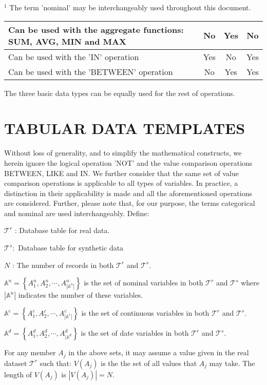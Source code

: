 \documentclass[10pt]{article}
\begin{document}
${ }^{1}$ The term 'nominal' may be interchangeably used throughout this document.

\begin{tabular}{|l|c|c|c|}
\hline
Can be used with the aggregate functions: SUM, AVG, MIN and MAX & No & Yes & No \\
\hline
Can be used with the 'IN' operation & Yes & No & Yes \\
\hline
Can be used with the 'BETWEEN' operation & No & Yes & Yes \\
\hline
\end{tabular}

The three basic data types can be equally used for the rest of operations.

\section{TABULAR DATA TEMPLATES}
Without loss of generality, and to simplify the mathematical constructs, we herein ignore the logical operation 'NOT' and the value comparison operations BETWEEN, LIKE and IN. We further consider that the same set of value comparison operations is applicable to all types of variables. In practice, a distinction in their applicability is made and all the aforementioned operations are considered. Further, please note that, for our purpose, the terms categorical and nominal are used interchangeably. Define:

$\mathcal{T}^{r}$ : Database table for real data.

$\mathcal{T}^{s}:$ Database table for synthetic data

$N$ : The number of records in both $\mathcal{T}^{r}$ and $\mathcal{T}^{s}$.

$\mathbb{A}^{n}=\left\{A_{1}^{n}, A_{2}^{n}, \cdots, A_{\left|\mathbb{A}^{n}\right|}^{n}\right\}$ is the set of nominal variables in both $\mathcal{T}^{r}$ and $\mathcal{T}^{s}$ where $\left|\mathbb{A}^{n}\right|$ indicates the number of these variables.

$\mathbb{A}^{c}=\left\{A_{1}^{c}, A_{2}^{c}, \cdots, A_{\left|\mathbb{A}^{c}\right|}^{c}\right\}$ is the set of continuous variables in both $\mathcal{T}^{r}$ and $\mathcal{T}^{s}$.

$\mathbb{A}^{d}=\left\{A_{1}^{d}, A_{2}^{d}, \cdots, A_{\mid \mathbb{A}^{d}}^{d}\right\}$ is the set of date variables in both $\mathcal{T}^{r}$ and $\mathcal{T}^{s}$.

For any member $A_{j}$ in the above sets, it may assume a value given in the real dataset $\mathcal{T}^{r}$ such that: $V\left(A_{j}\right)$ is the the set of all values that $A_{j}$ may take. The length of $V\left(A_{j}\right)$ is $\left|V\left(A_{j}\right)\right|=N$.
\end{document}
